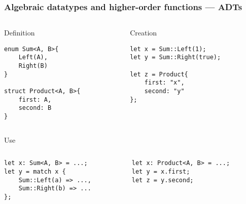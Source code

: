 \documentclass[t]{beamer}
\begin{document}
\begin{frame}[fragile]
\frametitle{Algebraic datatypes and higher-order functions --- ADTs}

\begin{columns}

\begin{column}[T]{0.48\textwidth}

\begin{block}{Definition}
\small
\begin{verbatim}
enum Sum<A, B>{
    Left(A),
    Right(B)
}

struct Product<A, B>{
    first: A,
    second: B
}
\end{verbatim}
\end{block}
\end{column}

\begin{column}[T]{0.48\textwidth}
\begin{block}{Creation}
\small
\begin{verbatim}
let x = Sum::Left(1);
let y = Sum::Right(true);

let z = Product{
    first: "x",
    second: "y"
};


\end{verbatim}
\end{block}
\end{column}

\end{columns}

\begin{block}{Use}
\begin{columns}
\begin{column}[T]{0.48\textwidth}
\small
\begin{verbatim}
let x: Sum<A, B> = ...;
let y = match x {
    Sum::Left(a) => ...,
    Sum::Right(b) => ...
};
\end{verbatim}
\end{column}
\begin{column}[T]{0.48\textwidth}
\small
\begin{verbatim}
let x: Product<A, B> = ...;
let y = x.first;
let z = y.second;
\end{verbatim}
\end{column}
\end{columns}
\end{block}

\end{frame}
\end{document}
